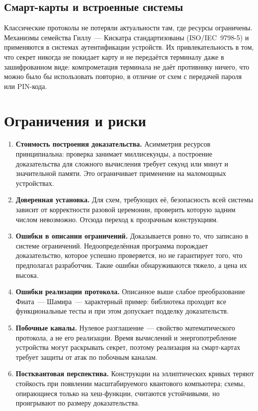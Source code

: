 \documentclass[14pt,a4paper]{extarticle}
\begin{document}
\subsection{Смарт-карты и встроенные системы}

Классические протоколы не потеряли актуальности там, где ресурсы ограничены. Механизмы
семейства Гиллу~--- Кискатра стандартизованы (ISO/IEC~9798-5) и применяются в
системах аутентификации устройств. Их привлекательность в том, что секрет никогда не
покидает карту и не передаётся терминалу даже в зашифрованном виде: компрометация
терминала не даёт противнику ничего, что можно было бы использовать повторно, в отличие
от схем с передачей пароля или PIN-кода.

\section{Ограничения и риски}

\begin{enumerate}
\item \textbf{Стоимость построения доказательства.} Асимметрия ресурсов принципиальна:
проверка занимает миллисекунды, а построение доказательства для сложного вычисления
требует секунд или минут и значительной памяти. Это ограничивает применение на
маломощных устройствах.

\item \textbf{Доверенная установка.} Для схем, требующих её, безопасность всей системы
зависит от корректности разовой церемонии, проверить которую задним числом невозможно.
Отсюда переход к прозрачным конструкциям.

\item \textbf{Ошибки в описании ограничений.} Доказывается ровно то, что записано в
системе ограничений. Недоопределённая программа порождает доказательство, которое
успешно проверяется, но не гарантирует того, что предполагал разработчик. Такие ошибки
обнаруживаются тяжело, а цена их высока.

\item \textbf{Ошибки реализации протокола.} Описанное выше слабое преобразование
Фиата~--- Шамира~--- характерный пример: библиотека проходит все функциональные тесты и
при этом допускает подделку доказательств.

\item \textbf{Побочные каналы.} Нулевое разглашение~--- свойство математического
протокола, а не его реализации. Время вычислений и энергопотребление устройства могут
раскрывать секрет, поэтому реализация на смарт-картах требует защиты от атак по
побочным каналам.

\item \textbf{Постквантовая перспектива.} Конструкции на эллиптических кривых теряют
стойкость при появлении масштабируемого квантового компьютера; схемы, опирающиеся
только на хеш-функции, считаются устойчивыми, но проигрывают по размеру доказательства.
\end{enumerate}
\end{document}
